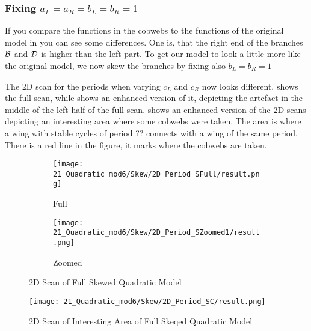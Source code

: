 \subsubsection{Fixing $a_L = a_R = b_L = b_R = 1$}

If you compare the functions in the cobwebs  to the functions of the original model in  you can see some differences.
One is, that the right end of the branches $\mathcal{B}$ and $\mathcal{D}$ is higher than the left part.
To get our model to look a little more like the original model, we now skew the branches by fixing also $b_L = b_R = 1$

The 2D scan for the periods when varying $c_L$ and $c_R$ now looks different.
 shows the full scan, while  shows an enhanced version of it, depicting the artefact in the middle of the left half of the full scan.
 shows an enhanced version of the 2D scans depicting an interesting area where some cobwebs were taken.
The area is where a wing with stable cycles of period ?? connects with a wing of the same period.
There is a red line in the figure, it marks where the cobwebs are taken.

\begin{figure}
    \centering
    \begin{subfigure}{0.4\textwidth}
        \centering
        \texttt{[image: 21\_Quadratic\_mod6/Skew/2D\_Period\_SFull/result.png]}
        \caption{Full}
        \label{fig:quadratic.full.skew.2d.full}
    \end{subfigure}
    \begin{subfigure}{0.4\textwidth}
        \centering
        \texttt{[image: 21\_Quadratic\_mod6/Skew/2D\_Period\_SZoomed1/result.png]}
        \caption{Zoomed}
        \label{fig:quadratic.full.skew.2d.z1}
    \end{subfigure}
    \caption{2D Scan of Full Skewed Quadratic Model}
\end{figure}

\begin{figure}
    \centering
    \texttt{[image: 21\_Quadratic\_mod6/Skew/2D\_Period\_SC/result.png]}
    \caption{2D Scan of Interesting Area of Full Skeqed Quadratic Model}
    \label{fig:quadratic.full.skew.2d.c}
\end{figure}

